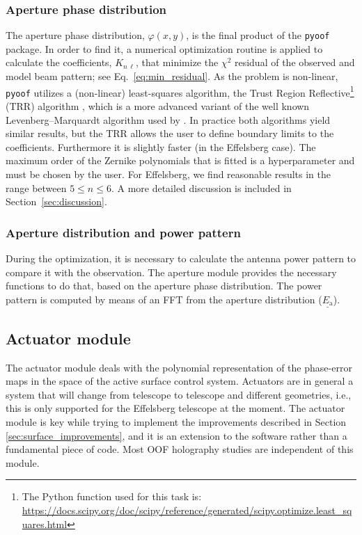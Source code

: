 \documentclass[
    ]
    {aa}
\begin{document}
    \subsubsection{Aperture phase distribution}
    The aperture phase distribution, $\varphi(x, y)$, is the final product of the \texttt{pyoof} package. In order to find it, a numerical optimization routine is applied to calculate the coefficients, $K_{n\,\ell}$, that minimize the $\chi^2$ residual of the observed and model beam pattern; see Eq.~\eqref{eq:min_residual}. As the problem is non-linear, \texttt{pyoof} utilizes a (non-linear) least-squares algorithm, the Trust Region Reflective\footnote{The Python function used for this task is: \url{https://docs.scipy.org/doc/scipy/reference/generated/scipy.optimize.least_squares.html}} (TRR) algorithm \citep[see][Chapter~4]{nocedal2006numerical}, which is a more advanced variant of the well known Levenberg–Marquardt algorithm used by \citet{2007A&A...465..679N,2007A&A...465..685N}. In practice both algorithms yield similar results, but the TRR allows the user to define boundary limits to the coefficients. Furthermore it is slightly faster (in the Effelsberg case). 
    The maximum order of the Zernike polynomials that is fitted is a hyperparameter and must be chosen by the user. For Effelsberg, we find reasonable results in the range between $5\leq n \leq6$. A more detailed discussion is included in Section~\ref{sec:discussion}. 

    \subsubsection{Aperture distribution and power pattern}
    During the optimization, it is necessary to calculate the antenna power pattern to compare it with the observation. The aperture module provides the necessary functions to do that, based on the aperture phase distribution. The power pattern is computed by means of an FFT from the aperture distribution ($\underline{E_\text{a}}$).

    \subsection{Actuator module}
    \label{sec:actuator_module}

    The actuator module deals with the polynomial representation of the phase-error maps in the space of the active surface control system. Actuators are in general a system that will change from telescope to telescope and different geometries, i.e., this is only supported for the Effelsberg telescope at the moment. The actuator module is key while trying to implement the improvements described in Section \ref{sec:surface_improvements}, and it is an extension to the software rather than a fundamental piece of code. Most OOF holography studies are independent of this module.
\end{document}
